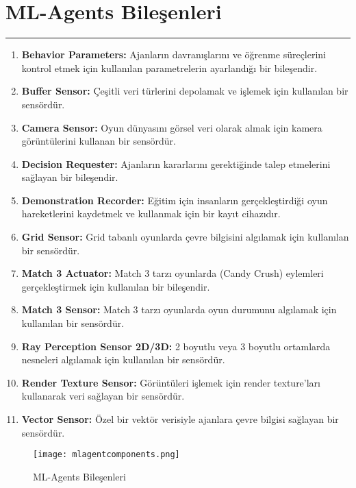 \documentclass{article}
\begin{document}
\section{ML-Agents Bileşenleri}
\rule{\textwidth}{0.5pt}
\begin{enumerate}
    \item \textbf {Behavior Parameters:} Ajanların davranışlarını ve öğrenme süreçlerini kontrol etmek için kullanılan parametrelerin ayarlandığı bir bileşendir.
    \item \textbf {Buffer Sensor:} Çeşitli veri türlerini depolamak ve işlemek için kullanılan bir sensördür.
    \item \textbf {Camera Sensor:} Oyun dünyasını görsel veri olarak almak için kamera görüntülerini kullanan bir sensördür.
    \item \textbf {Decision Requester:} Ajanların kararlarını gerektiğinde talep etmelerini sağlayan bir bileşendir.
    \item \textbf {Demonstration Recorder:} Eğitim için insanların gerçekleştirdiği oyun hareketlerini kaydetmek ve kullanmak için bir kayıt cihazıdır.
    \item \textbf {Grid Sensor:} Grid tabanlı oyunlarda çevre bilgisini algılamak için kullanılan bir sensördür.
    \item \textbf {Match 3 Actuator:} Match 3 tarzı oyunlarda (Candy Crush) eylemleri gerçekleştirmek için kullanılan bir bileşendir.
    \item \textbf {Match 3 Sensor:} Match 3 tarzı oyunlarda oyun durumunu algılamak için kullanılan bir sensördür.
    \item \textbf {Ray Perception Sensor 2D/3D:} 2 boyutlu veya 3 boyutlu ortamlarda nesneleri algılamak için kullanılan bir sensördür.
    \item \textbf {Render Texture Sensor:} Görüntüleri işlemek için render texture'ları kullanarak veri sağlayan bir sensördür.
    \item \textbf {Vector Sensor:} Özel bir vektör verisiyle ajanlara çevre bilgisi sağlayan bir sensördür.\\[15pt]
\end{enumerate}

\begin{figure}
    \begin{center}
        \texttt{[image: mlagentcomponents.png]}
    \end{center}
      \caption{ML-Agents Bileşenleri}
\end{figure}
\end{document}
